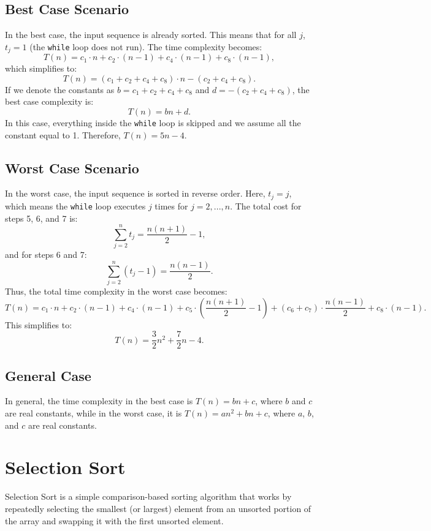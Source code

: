     \subsection{Best Case Scenario}
    In the best case, the input sequence is already sorted. This means that for all $j$, $t_j = 1$ (the \texttt{while} loop does not run). The time complexity becomes:
    \[
    T(n) = c_1 \cdot n + c_2 \cdot (n-1) + c_4 \cdot (n-1) + c_8 \cdot (n-1),
    \]
    which simplifies to:
    \[
    T(n) = (c_1 + c_2 + c_4 + c_8) \cdot n - (c_2 + c_4 + c_8).
    \]
    If we denote the constants as $b = c_1 + c_2 + c_4 + c_8$ and $d = -(c_2 + c_4 + c_8)$, the best case complexity is:
    \[
    T(n) = bn + d.
    \]
    In this case, everything inside the \texttt{while} loop is skipped and we assume all the constant equal to 1. Therefore, $T(n) = 5n - 4$.
    
    \subsection{Worst Case Scenario}
    In the worst case, the input sequence is sorted in reverse order. Here, $t_j = j$, which means the \texttt{while} loop executes $j$ times for $j=2,...,n$. The total cost for steps 5, 6, and 7 is:
    \[
    \sum_{j=2}^{n} t_j = \frac{n(n+1)}{2} - 1,
    \]
    and for steps 6 and 7:
    \[
    \sum_{j=2}^{n} (t_j - 1) = \frac{n(n-1)}{2}.
    \]
    Thus, the total time complexity in the worst case becomes:
    \[
    T(n) = c_1 \cdot n + c_2 \cdot (n-1) + c_4 \cdot (n-1) + c_5 \cdot \left(\frac{n(n+1)}{2} - 1\right) + (c_6 + c_7) \cdot \frac{n(n-1)}{2} + c_8 \cdot (n-1).
    \]
    This simplifies to:
    \[
    T(n) = \frac{3}{2}n^2 + \frac{7}{2}n - 4.
    \]
    
    \subsection{General Case}
    In general, the time complexity in the best case is $T(n) = bn + c$, where $b$ and $c$ are real constants, while in the worst case, it is $T(n) = an^2 + bn + c$, where $a$, $b$, and $c$ are real constants.

    \section{Selection Sort}
    Selection Sort is a simple comparison-based sorting algorithm that works by repeatedly selecting the smallest (or largest) element from an unsorted portion of the array and swapping it with the first unsorted element. 
    
